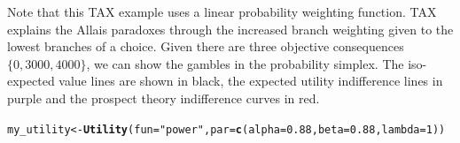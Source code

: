 \documentclass{article}\usepackage[]{graphicx}\usepackage[]{color}
\makeatletter
\newcommand{\hlnum}[1]{\textcolor[rgb]{0.686,0.059,0.569}{#1}}%
\newcommand{\hlstr}[1]{\textcolor[rgb]{0.192,0.494,0.8}{#1}}%
\newcommand{\hlstd}[1]{\textcolor[rgb]{0.345,0.345,0.345}{#1}}%
\newcommand{\hlkwb}[1]{\textcolor[rgb]{0.69,0.353,0.396}{#1}}%
\newcommand{\hlkwc}[1]{\textcolor[rgb]{0.333,0.667,0.333}{#1}}%
\newcommand{\hlkwd}[1]{\textcolor[rgb]{0.737,0.353,0.396}{\textbf{#1}}}%
\newenvironment{kframe}{%
 \def\at@end@of@kframe{}%
 \ifinner\ifhmode%
  \def\at@end@of@kframe{\end{minipage}}%
  \begin{minipage}{\columnwidth}%
 \fi\fi%
 \def\FrameCommand##1{\hskip\@totalleftmargin \hskip-\fboxsep
 \colorbox{shadecolor}{##1}\hskip-\fboxsep
     \hskip-\linewidth \hskip-\@totalleftmargin \hskip\columnwidth}%
 \MakeFramed {\advance\hsize-\width
   \@totalleftmargin\z@ \linewidth\hsize
   \@setminipage}}%
 {\par\unskip\endMakeFramed%
 \at@end@of@kframe}
\newenvironment{knitrout}{}{} %
\makeatother
\begin{document}
Note that this TAX example uses a linear probability weighting function. TAX explains the Allais paradoxes through the increased branch weighting given to the lowest branches of a choice.
Given there are three objective consequences $\{0, 3000, 4000\}$, we can show the gambles in the
probability simplex. The iso-expected value lines are shown in black, the expected utility indifference lines in purple and the prospect theory indifference curves in red.

\begin{knitrout}
\color{fgcolor}\begin{kframe}
\begin{alltt}
\hlstd{my_utility} \hlkwb{<-} \hlkwd{Utility}\hlstd{(}\hlkwc{fun}\hlstd{=}\hlstr{"power"}\hlstd{,} \hlkwc{par}\hlstd{=}\hlkwd{c}\hlstd{(}\hlkwc{alpha}\hlstd{=}\hlnum{0.88}\hlstd{,} \hlkwc{beta}\hlstd{=}\hlnum{0.88}\hlstd{,} \hlkwc{lambda}\hlstd{=}\hlnum{1}\hlstd{))}


\end{alltt}
\end{kframe}
\end{knitrout}
\end{document}
